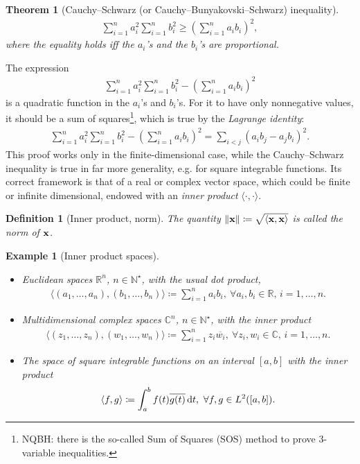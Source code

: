\documentclass[oneside]{book}
\numberwithin{equation}{section}
\newtheorem{definition}{Definition}[section]
\newtheorem{example}{Example}[section]
\newtheorem{theorem}{Theorem}[section]
\begin{document}
\begin{theorem}[Cauchy--Schwarz (or Cauchy--Bunyakovski--Schwarz) inequality]
	\begin{align}
		\boxed{\sum_{i=1}^n a_i^2\sum_{i=1}^n b_i^2\ge\left(\sum_{i=1}^n a_ib_i\right)^2,}
	\end{align}
	where the equality holds iff the $a_i$'s and the $b_i$'s are proportional.
\end{theorem}
The expression
\begin{align*}
	\sum_{i=1}^n a_i^2\sum_{i=1}^n b_i^2 - \left(\sum_{i=1}^n a_ib_i\right)^2
\end{align*}
is a quadratic function in the $a_i$'s and $b_i$'s. For it to have only nonnegative values, it should be a sum of squares\footnote{NQBH: there is the so-called Sum of Squares (SOS) method to prove 3-variable inequalities.}, which is true by the \textit{Lagrange identity}:
\begin{align*}
	\sum_{i=1}^n a_i^2\sum_{i=1}^n b_i^2 - \left(\sum_{i=1}^n a_ib_i\right)^2 = \sum_{i < j} (a_ib_j - a_jb_i)^2.
\end{align*}
This proof works only in the finite-dimensional case, while the Cauchy--Schwarz inequality is true in far more generality, e.g. for square integrable functions. Its correct framework is that of a real or complex vector space, which could be finite or infinite dimensional, endowed with an \textit{inner product} $\langle\cdot,\cdot\rangle$.

\begin{definition}[Inner product, norm]
	The quantity $\|{\bf x}\|\coloneqq\sqrt{\langle{\bf x},{\bf x}\rangle}$ is called the \emph{norm} of ${\bf x}$.
\end{definition}

\begin{example}[Inner product spaces]
	\begin{itemize}
		\item Euclidean spaces $\mathbb{R}^n$, $n\in\mathbb{N}^\star$, with the usual dot product,
		\begin{align*}
			\langle(a_1,\ldots,a_n),(b_1,\ldots,b_n)\rangle\coloneqq\sum_{i=1}^n a_ib_i,\ \forall a_i,b_i\in\mathbb{R},\,i = 1,\ldots,n.
		\end{align*}
		\item Multidimensional complex spaces $\mathbb{C}^n$, $n\in\mathbb{N}^\star$, with the inner product
		\begin{align*}
			\langle(z_1,\ldots,z_n),(w_1,\ldots,w_n)\rangle\coloneqq\sum_{i=1}^n z_i\overline{w_i},\ \forall z_i,w_i\in\mathbb{C},\,i = 1,\ldots,n.
		\end{align*}
		\item The space of square integrable functions on an interval $[a,b]$ with the inner product
		\begin{align*}
			\langle f,g\rangle\coloneqq\int_a^b f(t)\overline{g(t)}\,{\rm d}t,\ \forall f,g\in L^2([a,b]).
		\end{align*}
	\end{itemize}
\end{example}
\end{document}
